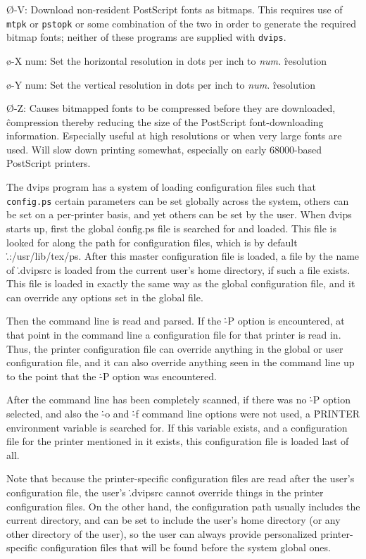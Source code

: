 {\O-V:
Download non-resident PostScript fonts as bitmaps.  This requires use
of {\tt mtpk} or {\tt pstopk} or some combination of the two in order
to generate the required bitmap fonts; neither of these programs are
supplied with {\tt dvips}.

\o-X num:
Set the horizontal resolution in dots per inch to {\it num.}
\^{resolution}

\o-Y num:
Set the vertical resolution in dots per inch to {\it num.}
\^{resolution}

\O-Z:
Causes bitmapped fonts to be compressed before they are downloaded,
\^{compression}
thereby reducing the size of the PostScript font-downloading information.
Especially useful at high resolutions or when very large fonts are
used.  Will slow down printing somewhat, especially on early 68000-based
PostScript printers.\par}


The \.{dvips} program has a system of loading configuration files such that
\^{{\tt config.ps}}
certain parameters can be set globally across the system, others can be set
on a
per-printer basis, and yet others can be set by the user.  When \.{dvips}
starts up, first the global \.{config.ps} file is searched for and loaded.
This file is looked for along the path for configuration files, which is by
default \.{.:/usr/lib/tex/ps}.
After this master configuration file is loaded, a file by the name of
\.{.dvipsrc} is loaded from the current user's home directory, if such
a file exists.	This file is loaded in exactly the same way as the global
configuration file, and it can override any options set in the global
file.

Then the command line is read and parsed.  If the \.{-P} option is
encountered, at that point in the command line a configuration file
for that printer is read in.  Thus, the printer configuration file can
override anything in the global or user configuration file, and it can
also override anything seen in the command line up to the point that the
\.{-P} option was encountered.

After the command line has been completely scanned, if there was no
\.{-P} option selected, and also the \.{-o} and \.{-f} command line
options were not used, a \.{PRINTER} environment variable is
searched for.  If this variable exists, and a configuration file for
the printer mentioned in it exists, this configuration file is
loaded last of all.

Note that because the printer-specific configuration files are read
after the user's configuration file, the user's \.{.dvipsrc}
cannot override things in
the printer configuration files.  On the other hand, the configuration path
usually includes the current directory, and can be set to include the
user's home directory (or any other directory of the user), so the user can
always provide personalized printer-specific configuration files that will
be found before the system global ones.

